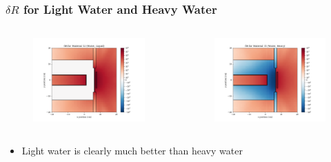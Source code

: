 \documentclass[t]{beamer}
\begin{document}
\begin{frame}
  \frametitle{$\delta R$ for Light Water and Heavy Water}
  \vskip-0.3in
  \begin{columns}
    \begin{figure}
      \includegraphics[trim={0.7in 0.15in 1.05in 0.4in},clip,scale=0.36]{images/dR_12.png}
    \end{figure}
    \begin{figure}
      \includegraphics[trim={0.7in 0.15in 1.05in 0.4in},clip,scale=0.36]{images/dR_11.png}
    \end{figure}
  \end{columns}
  \begin{itemize}
    \item Light water is clearly much better than heavy water
  \end{itemize}
\end{frame}
\end{document}
